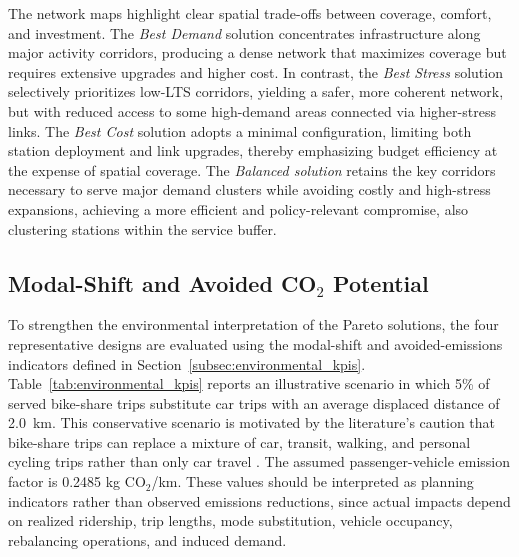 \documentclass[preprint,authoryear,10pt]{elsarticle}
\begin{document}
The network maps highlight clear spatial trade-offs between coverage, comfort, and investment. The \textit{Best Demand} solution concentrates infrastructure along major activity corridors, producing a dense network that maximizes coverage but requires extensive upgrades and higher cost. In contrast, the \textit{Best Stress} solution selectively prioritizes low-LTS corridors, yielding a safer, more coherent network, but with reduced access to some high-demand areas connected via higher-stress links. The \textit{Best Cost} solution adopts a minimal configuration, limiting both station deployment and link upgrades, thereby emphasizing budget efficiency at the expense of spatial coverage. The \textit{Balanced solution} retains the key corridors necessary to serve major demand clusters while avoiding costly and high-stress expansions, achieving a more efficient and policy-relevant compromise, also clustering stations within the service buffer.

\subsection{Modal-Shift and Avoided \texorpdfstring{CO$_2$}{CO2} Potential}\label{subsec:co2_results}

To strengthen the environmental interpretation of the Pareto solutions, the four representative designs are evaluated using the modal-shift and avoided-emissions indicators defined in Section~\ref{subsec:environmental_kpis}. Table~\ref{tab:environmental_kpis} reports an illustrative scenario in which 5\% of served bike-share trips substitute car trips with an average displaced distance of 2.0~km. This conservative scenario is motivated by the literature's caution that bike-share trips can replace a mixture of car, transit, walking, and personal cycling trips rather than only car travel \citep{fuller2013potential, RICCI201528, saltykova2022environmental}. The assumed passenger-vehicle emission factor is 0.2485 kg CO$_2$/km. These values should be interpreted as planning indicators rather than observed emissions reductions, since actual impacts depend on realized ridership, trip lengths, mode substitution, vehicle occupancy, rebalancing operations, and induced demand.
\end{document}
